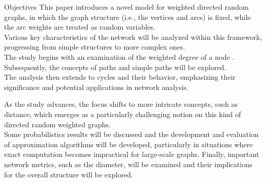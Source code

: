 \begin{projsection}{Objectives}
	This paper introduces a novel model for weighted directed random graphs, in which the graph structure (i.e., the vertices and arcs) is fixed, while the arc weights are treated as random variables.\\
	Various key characteristics of the network will be analyzed within this framework, progressing from simple structures to more complex ones.\\
	The study begins with an examination of the weighted degree of a node \cite{gonzalez2010an}. Subsequently, the concepts of paths and simple paths will be explored.\\
	The analysis then extends to cycles and their behavior, emphasizing their significance and potential applications in network analysis.
	
	As the study advances, the focus shifts to more intricate concepts, such as distance, which emerges as a particularly challenging notion on this kind of directed random weighted graphs.\\
	Some probabilistics results will be discussed and the development and evaluation of approximation algorithms will be developed, particularly in situations where exact computation becomes impractical for large-scale graphs.
	Finally, important network metrics, such as the diameter, will be examined and their implications for the overall structure will be explored.
\end{projsection}